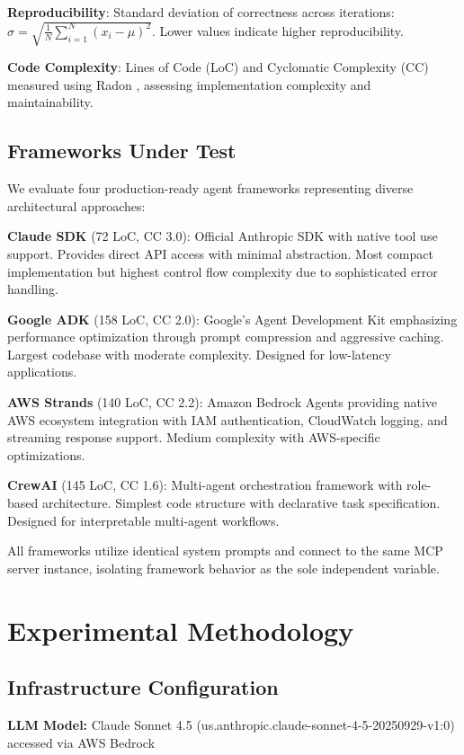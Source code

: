\documentclass[sigconf,nonacm]{acmart}
\begin{document}
\textbf{Reproducibility}: Standard deviation of correctness across iterations: $\sigma = \sqrt{\frac{1}{N}\sum_{i=1}^{N}(x_i - \mu)^2}$. Lower values indicate higher reproducibility.

\textbf{Code Complexity}: Lines of Code (LoC) and Cyclomatic Complexity (CC) measured using Radon \cite{radon2023}, assessing implementation complexity and maintainability.

\subsection{Frameworks Under Test}

We evaluate four production-ready agent frameworks representing diverse architectural approaches:

\textbf{Claude SDK} (72 LoC, CC 3.0): Official Anthropic SDK with native tool use support. Provides direct API access with minimal abstraction. Most compact implementation but highest control flow complexity due to sophisticated error handling.

\textbf{Google ADK} (158 LoC, CC 2.0): Google's Agent Development Kit emphasizing performance optimization through prompt compression and aggressive caching. Largest codebase with moderate complexity. Designed for low-latency applications.

\textbf{AWS Strands} (140 LoC, CC 2.2): Amazon Bedrock Agents providing native AWS ecosystem integration with IAM authentication, CloudWatch logging, and streaming response support. Medium complexity with AWS-specific optimizations.

\textbf{CrewAI} (145 LoC, CC 1.6): Multi-agent orchestration framework with role-based architecture. Simplest code structure with declarative task specification. Designed for interpretable multi-agent workflows.

All frameworks utilize identical system prompts and connect to the same MCP server instance, isolating framework behavior as the sole independent variable.

\section{Experimental Methodology}

\subsection{Infrastructure Configuration}

\textbf{LLM Model:} Claude Sonnet 4.5 (us.anthropic.claude-sonnet-4-5-20250929-v1:0) accessed via AWS Bedrock
\end{document}
